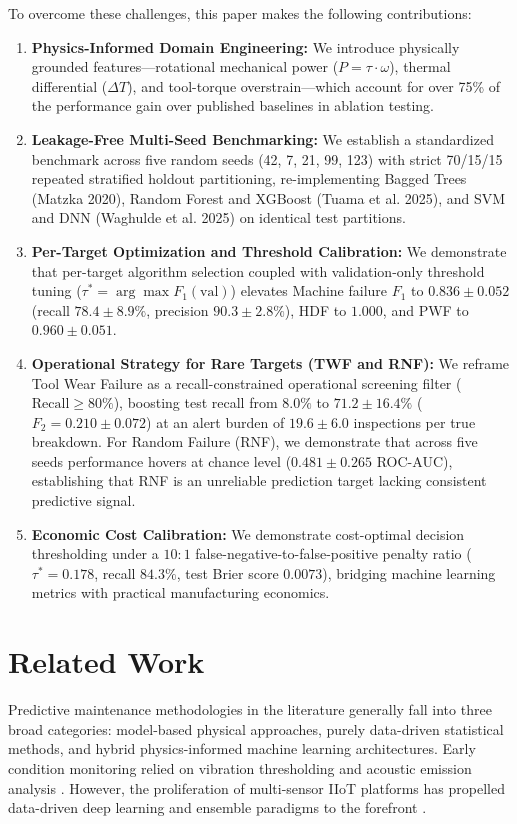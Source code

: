 \documentclass[conference]{IEEEtran}
\begin{document}
To overcome these challenges, this paper makes the following contributions:
\begin{enumerate}
    \item \textbf{Physics-Informed Domain Engineering:} We introduce physically grounded features—rotational mechanical power ($P = \tau \cdot \omega$), thermal differential ($\Delta T$), and tool-torque overstrain—which account for over 75\% of the performance gain over published baselines in ablation testing.
    \item \textbf{Leakage-Free Multi-Seed Benchmarking:} We establish a standardized benchmark across five random seeds (42, 7, 21, 99, 123) with strict 70/15/15 repeated stratified holdout partitioning, re-implementing Bagged Trees (Matzka 2020), Random Forest and XGBoost (Tuama et al. 2025), and SVM and DNN (Waghulde et al. 2025) on identical test partitions.
    \item \textbf{Per-Target Optimization and Threshold Calibration:} We demonstrate that per-target algorithm selection coupled with validation-only threshold tuning ($\tau^* = \arg\max F_1(\text{val})$) elevates Machine failure $F_1$ to $0.836 \pm 0.052$ (recall $78.4 \pm 8.9\%$, precision $90.3 \pm 2.8\%$), HDF to $1.000$, and PWF to $0.960 \pm 0.051$.
    \item \textbf{Operational Strategy for Rare Targets (TWF and RNF):} We reframe Tool Wear Failure as a recall-constrained operational screening filter ($\text{Recall} \ge 80\%$), boosting test recall from $8.0\%$ to $71.2 \pm 16.4\%$ ($F_2 = 0.210 \pm 0.072$) at an alert burden of $19.6 \pm 6.0$ inspections per true breakdown. For Random Failure (RNF), we demonstrate that across five seeds performance hovers at chance level ($0.481 \pm 0.265$ ROC-AUC), establishing that RNF is an unreliable prediction target lacking consistent predictive signal.
    \item \textbf{Economic Cost Calibration:} We demonstrate cost-optimal decision thresholding under a $10:1$ false-negative-to-false-positive penalty ratio ($\tau^* = 0.178$, recall $84.3\%$, test Brier score $0.0073$), bridging machine learning metrics with practical manufacturing economics.
\end{enumerate}

\section{Related Work}

Predictive maintenance methodologies in the literature generally fall into three broad categories: model-based physical approaches, purely data-driven statistical methods, and hybrid physics-informed machine learning architectures. Early condition monitoring relied on vibration thresholding and acoustic emission analysis \cite{b1, b2}. However, the proliferation of multi-sensor IIoT platforms has propelled data-driven deep learning and ensemble paradigms to the forefront \cite{b3, b4}.
\end{document}
